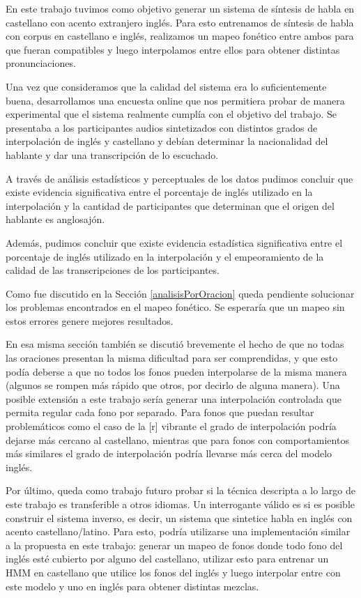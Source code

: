 En este trabajo tuvimos como objetivo generar un sistema de síntesis de habla en castellano con acento extranjero inglés. Para esto entrenamos  de síntesis de habla con corpus en castellano e inglés, realizamos un mapeo fonético entre ambos para que fueran compatibles y luego interpolamos entre ellos para obtener distintas pronunciaciones.

Una vez que consideramos que la calidad del sistema era lo suficientemente buena, desarrollamos una encuesta online que nos permitiera probar de manera experimental que el sistema realmente cumplía con el objetivo del trabajo. Se presentaba a los participantes audios sintetizados con distintos grados de interpolación de inglés y castellano y debían determinar la nacionalidad del hablante y dar una transcripción de lo escuchado.

A través de análisis estadísticos y perceptuales de los datos pudimos concluir que existe evidencia significativa entre el porcentaje de inglés utilizado en la interpolación y la cantidad de participantes que determinan que el origen del hablante es anglosajón.

Además, pudimos concluir que existe evidencia estadística significativa entre el porcentaje de inglés utilizado en la interpolación y el empeoramiento de la calidad de las transcripciones de los participantes.

Como fue discutido en la Sección \ref{analisisPorOracion} queda pendiente solucionar los problemas encontrados en el mapeo fonético. Se esperaría que un mapeo sin estos errores genere mejores resultados.

En esa misma sección también se discutió brevemente el hecho de que no todas las oraciones presentan la misma dificultad para ser comprendidas, y que esto podía deberse a que no todos los fonos pueden interpolarse de la misma manera (algunos se rompen más rápido que otros, por decirlo de alguna manera). Una posible extensión a este trabajo sería generar una interpolación controlada que permita regular cada fono por separado. Para fonos que puedan resultar problemáticos como el caso de la [r] vibrante el grado de interpolación podría dejarse más cercano al castellano, mientras que para fonos con comportamientos más similares el grado de interpolación podría llevarse más cerca del modelo inglés.

Por último, queda como trabajo futuro probar si la técnica descripta a lo largo de este trabajo es transferible a otros idiomas. Un interrogante válido es si es posible construir el sistema inverso, es decir, un sistema que sintetice habla en inglés con acento castellano/latino. Para esto, podría utilizarse una implementación similar a la propuesta en este trabajo: generar un mapeo de fonos donde todo fono del inglés esté cubierto por alguno del castellano, utilizar esto para entrenar un HMM en castellano que utilice los fonos del inglés y luego interpolar entre con este modelo y uno en inglés para obtener distintas mezclas.